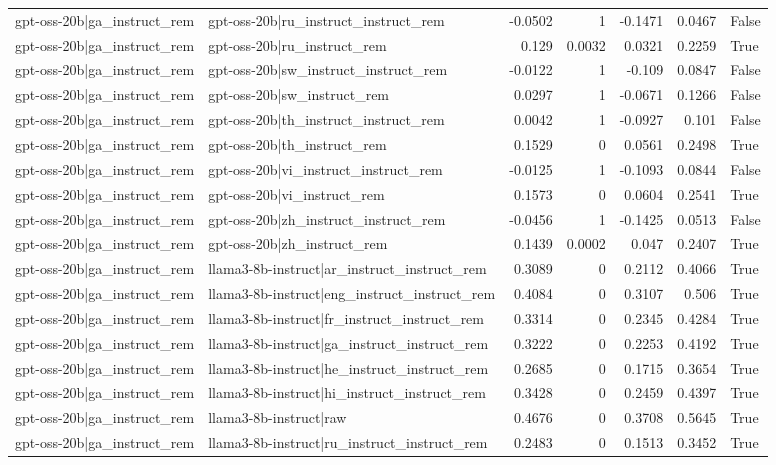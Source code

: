 \begin{table}
\begin{tabular}{l l r r r r l}
gpt-oss-20b|ga_instruct_rem & gpt-oss-20b|ru_instruct_instruct_rem & -0.0502 & 1 & -0.1471 & 0.0467 & False \\
gpt-oss-20b|ga_instruct_rem & gpt-oss-20b|ru_instruct_rem & 0.129 & 0.0032 & 0.0321 & 0.2259 & True \\
gpt-oss-20b|ga_instruct_rem & gpt-oss-20b|sw_instruct_instruct_rem & -0.0122 & 1 & -0.109 & 0.0847 & False \\
gpt-oss-20b|ga_instruct_rem & gpt-oss-20b|sw_instruct_rem & 0.0297 & 1 & -0.0671 & 0.1266 & False \\
gpt-oss-20b|ga_instruct_rem & gpt-oss-20b|th_instruct_instruct_rem & 0.0042 & 1 & -0.0927 & 0.101 & False \\
gpt-oss-20b|ga_instruct_rem & gpt-oss-20b|th_instruct_rem & 0.1529 & 0 & 0.0561 & 0.2498 & True \\
gpt-oss-20b|ga_instruct_rem & gpt-oss-20b|vi_instruct_instruct_rem & -0.0125 & 1 & -0.1093 & 0.0844 & False \\
gpt-oss-20b|ga_instruct_rem & gpt-oss-20b|vi_instruct_rem & 0.1573 & 0 & 0.0604 & 0.2541 & True \\
gpt-oss-20b|ga_instruct_rem & gpt-oss-20b|zh_instruct_instruct_rem & -0.0456 & 1 & -0.1425 & 0.0513 & False \\
gpt-oss-20b|ga_instruct_rem & gpt-oss-20b|zh_instruct_rem & 0.1439 & 0.0002 & 0.047 & 0.2407 & True \\
gpt-oss-20b|ga_instruct_rem & llama3-8b-instruct|ar_instruct_instruct_rem & 0.3089 & 0 & 0.2112 & 0.4066 & True \\
gpt-oss-20b|ga_instruct_rem & llama3-8b-instruct|eng_instruct_instruct_rem & 0.4084 & 0 & 0.3107 & 0.506 & True \\
gpt-oss-20b|ga_instruct_rem & llama3-8b-instruct|fr_instruct_instruct_rem & 0.3314 & 0 & 0.2345 & 0.4284 & True \\
gpt-oss-20b|ga_instruct_rem & llama3-8b-instruct|ga_instruct_instruct_rem & 0.3222 & 0 & 0.2253 & 0.4192 & True \\
gpt-oss-20b|ga_instruct_rem & llama3-8b-instruct|he_instruct_instruct_rem & 0.2685 & 0 & 0.1715 & 0.3654 & True \\
gpt-oss-20b|ga_instruct_rem & llama3-8b-instruct|hi_instruct_instruct_rem & 0.3428 & 0 & 0.2459 & 0.4397 & True \\
gpt-oss-20b|ga_instruct_rem & llama3-8b-instruct|raw & 0.4676 & 0 & 0.3708 & 0.5645 & True \\
gpt-oss-20b|ga_instruct_rem & llama3-8b-instruct|ru_instruct_instruct_rem & 0.2483 & 0 & 0.1513 & 0.3452 & True \\

\end{tabular}
\end{table}
